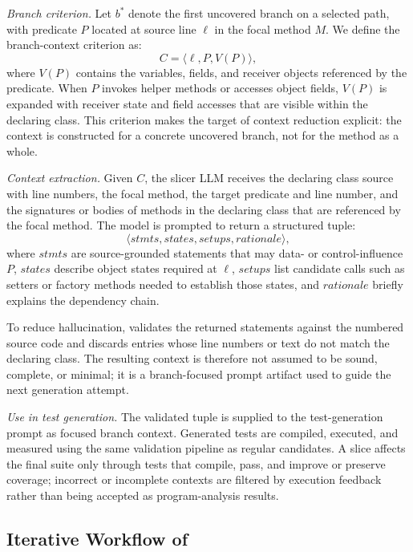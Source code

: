 \textit{Branch criterion.}
Let $b^*$ denote the first uncovered branch on a selected path, with predicate $P$ located at source line $\ell$ in the focal method $M$. We define the branch-context criterion as:
\begin{equation}
C = \langle \ell, P, V(P) \rangle,
\end{equation}
where $V(P)$ contains the variables, fields, and receiver objects referenced by the predicate. When $P$ invokes helper methods or accesses object fields, $V(P)$ is expanded with receiver state and field accesses that are visible within the declaring class. This criterion makes the target of context reduction explicit: the context is constructed for a concrete uncovered branch, not for the method as a whole.

\textit{Context extraction.}
Given $C$, the slicer LLM receives the declaring class source with line numbers, the focal method, the target predicate and line number, and the signatures or bodies of methods in the declaring class that are referenced by the focal method. The model is prompted to return a structured tuple:
\[
\langle \mathit{stmts}, \mathit{states}, \mathit{setups}, \mathit{rationale} \rangle,
\]
where $\mathit{stmts}$ are source-grounded statements that may data- or control-influence $P$, $\mathit{states}$ describe object states required at $\ell$, $\mathit{setups}$ list candidate calls such as setters or factory methods needed to establish those states, and $\mathit{rationale}$ briefly explains the dependency chain.

To reduce hallucination, \ourmethod{} validates the returned statements against the numbered source code and discards entries whose line numbers or text do not match the declaring class. The resulting context is therefore not assumed to be sound, complete, or minimal; it is a branch-focused prompt artifact used to guide the next generation attempt.

\textit{Use in test generation.}
The validated tuple is supplied to the test-generation prompt as focused branch context. Generated tests are compiled, executed, and measured using the same validation pipeline as regular candidates. A slice affects the final suite only through tests that compile, pass, and improve or preserve coverage; incorrect or incomplete contexts are filtered by execution feedback rather than being accepted as program-analysis results.

\subsection{Iterative Workflow of \ourmethod{}}

